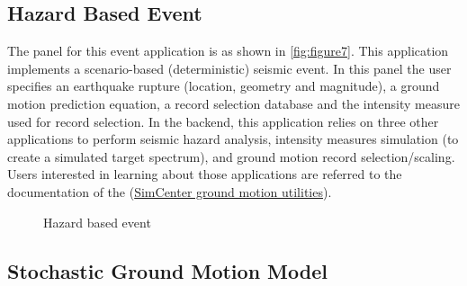\subsection{Hazard Based Event}
The panel for this event application is as shown
in \autoref{fig:figure7}.  This application implements a
scenario-based (deterministic) seismic event.  In this panel the user
specifies an earthquake rupture (location, geometry and magnitude), a
ground motion prediction equation, a record selection database and the
intensity measure used for record selection.  In the backend, this
application relies on three other applications to perform seismic
hazard analysis, intensity measures simulation (to create a simulated
target spectrum), and ground motion record selection/scaling.  Users
interested in learning about those applications are referred to the
documentation of the
(\href{https://github.com/NHERI-SimCenter/GroundMotionUtilities/blob/master/Readme.md}{SimCenter
ground motion utilities}).
\begin{figure}[!htbp]
  \caption{Hazard based event}
  \label{fig:figure7}
\end{figure}

\subsection{Stochastic Ground Motion Model}





